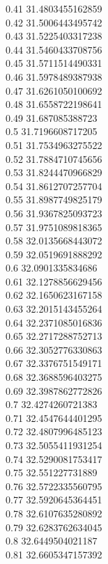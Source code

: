 {0.41	31.4803455162859\\
0.42	31.5006443495742\\
0.43	31.5225403317238\\
0.44	31.5460433708756\\
0.45	31.5711514490331\\
0.46	31.5978489387938\\
0.47	31.6261050100692\\
0.48	31.6558722198641\\
0.49	31.687085388723\\
0.5	31.7196608717205\\
0.51	31.7534963275522\\
0.52	31.7884710745656\\
0.53	31.8244470966829\\
0.54	31.8612707257704\\
0.55	31.8987749825179\\
0.56	31.9367825093723\\
0.57	31.9751089818365\\
0.58	32.0135668443072\\
0.59	32.0519691888292\\
0.6	32.0901335834686\\
0.61	32.1278856629456\\
0.62	32.1650623167158\\
0.63	32.2015143455264\\
0.64	32.2371085016836\\
0.65	32.2717288752713\\
0.66	32.3052776330863\\
0.67	32.3376751549171\\
0.68	32.3688596403275\\
0.69	32.3987862772826\\
0.7	32.4274260721383\\
0.71	32.4547644401295\\
0.72	32.4807996485123\\
0.73	32.5055411931254\\
0.74	32.5290081753417\\
0.75	32.551227731889\\
0.76	32.5722335560795\\
0.77	32.5920645364451\\
0.78	32.6107635280892\\
0.79	32.6283762634045\\
0.8	32.6449504021187\\
0.81	32.6605347157392\\
}
